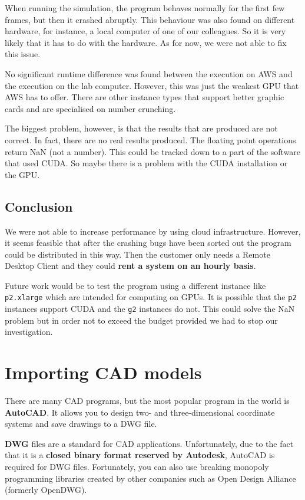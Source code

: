 \documentclass[a4paper, 11pt, article]{report}
\begin{document}
When running the simulation, the program behaves normally for the first few frames, but then it crashed abruptly. This behaviour was also found on different hardware, for instance, a local computer of one of our colleagues. So it is very likely that it has to do with the hardware. As for now, we were not able to fix this issue. 

No significant runtime difference was found between the execution on AWS and the execution on the lab computer. However, this was just the weakest GPU that AWS has to offer. There are other instance types that support better graphic cards and are specialised on number crunching. 

The biggest problem, however, is that the results that are produced are not correct. In fact, there are no real results produced. The floating point operations return NaN (not a number). This could be tracked down to a part of the software that used CUDA. So maybe there is a problem with the CUDA installation or the GPU. 

\subsection{Conclusion}

We were not able to increase performance by using cloud infrastructure. However, it seems feasible that after the crashing bugs have been sorted out the program could be distributed in this way. Then the customer only needs a Remote Desktop Client and they could \textbf{rent a system on an hourly basis}. 

Future work would be to test the program using a different instance like \texttt{p2.xlarge} which are intended for computing on GPUs. It is possible that the \texttt{p2} instances support CUDA and the \texttt{g2} instances do not. This could solve the NaN problem but in order not to exceed the budget provided we had to stop our investigation.

\section{Importing CAD models}
   
There are many CAD programs, but the most popular program in the world is \textbf{AutoCAD}. It allows you to design two- and three-dimensional coordinate systems and save drawings to a DWG file.

\textbf{DWG} files are a standard for CAD applications. Unfortunately, due to the fact that it is a \textbf{closed binary format reserved by Autodesk}, AutoCAD is required for DWG files. Fortunately, you can also use breaking monopoly programming libraries created by other companies such as Open Design Alliance (formerly OpenDWG).
\end{document}
